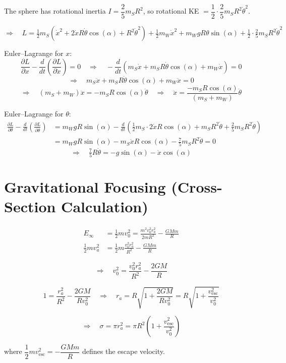 The sphere has rotational inertia $I = \dfrac{2}{5}m_S R^2$, so rotational KE $= \dfrac{1}{2}\cdot\dfrac{2}{5}m_S R^2\dot\theta^2$.

\[
    \Rightarrow\quad L = \tfrac{1}{2}m_S(\dot x^2 + 2\dot x R\dot\theta\cos(\alpha) + R^2\dot\theta^2)
    + \tfrac{1}{2}m_W\dot x^2 + m_W g R\theta\sin(\alpha)
    + \tfrac{1}{2}\cdot\tfrac{2}{5}m_S R^2\dot\theta^2
\]

Euler--Lagrange for $x$:
\[
    \frac{\partial L}{\partial x} - \frac{d}{dt}\!\left(\frac{\partial L}{\partial \dot x}\right) = 0
    \quad\Rightarrow\quad
    -\frac{d}{dt}\!\left(m_S\dot x + m_S R\dot\theta\cos(\alpha) + m_W\dot x\right) = 0
\]
\[
    \Rightarrow\quad m_S\ddot x + m_S R\ddot\theta\cos(\alpha) + m_W\ddot x = 0
\]
\[
    \Rightarrow\quad (m_S + m_W)\ddot x = -m_S R\cos(\alpha)\ddot\theta
    \quad\Rightarrow\quad
    \ddot x = \frac{-m_S R\cos(\alpha)}{(m_S + m_W)}\ddot\theta
\]

Euler--Lagrange for $\theta$:
\begin{align*}
    \frac{\partial L}{\partial \theta} - \frac{d}{dt}\!\left(\frac{\partial L}{\partial \dot\theta}\right)
    &= m_W g R\sin(\alpha)
    - \frac{d}{dt}\!\left(\tfrac{1}{2}m_S\cdot 2\dot x R\cos(\alpha) + m_S R^2\dot\theta
    + \tfrac{2}{5}m_S R^2\dot\theta\right) \\
    &= m_W g R\sin(\alpha) - m_S\ddot x R\cos(\alpha) - \tfrac{7}{5}m_S R^2\ddot\theta = 0
\end{align*}
\[
    \Rightarrow\quad \tfrac{7}{5}R\ddot\theta = -g\sin(\alpha) - \ddot x\cos(\alpha)
\]


\section{Gravitational Focusing (Cross-Section Calculation)}

\begin{align*}
    E_\infty &= \tfrac{1}{2}mv_0^2 = \frac{m^2 v_0^2 r_a^2}{2mR^2} - \frac{GMm}{R} \\
    \tfrac{1}{2}mv_a^2 &= \tfrac{1}{2}m\frac{v_0^2 r_a^2}{R^2} - \frac{GMm}{R}
\end{align*}

\[
    \Rightarrow\quad v_0^2 = \frac{v_0^2 r_a^2}{R^2} - \frac{2GM}{R}
\]

\[
    1 = \frac{r_a^2}{R^2} - \frac{2GM}{Rv_0^2}
    \quad\Rightarrow\quad
    r_a = R\sqrt{1 + \frac{2GM}{Rv_0^2}} = R\sqrt{1 + \frac{v_\text{esc}^2}{v_0^2}}
\]

\[
    \Rightarrow\quad \sigma = \pi r_a^2 = \pi R^2\!\left(1 + \frac{v_\text{esc}^2}{v_0^2}\right)
\]

where $\dfrac{1}{2}mv_\text{esc}^2 = -\dfrac{GMm}{R}$ defines the escape velocity.
